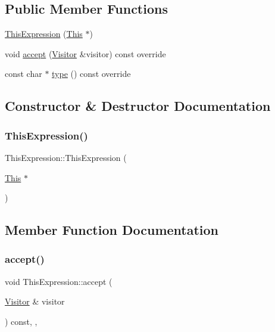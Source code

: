 \subsection*{Public Member Functions}
\begin{DoxyCompactItemize}
\item 
\hyperlink{struct_this_expression_ab81dc385702b0bad05253b765b96fa32}{This\+Expression} (\hyperlink{struct_this}{This} $\ast$)
\item 
void \hyperlink{struct_this_expression_ac22d0e35a45a0578fc864005c0a66def}{accept} (\hyperlink{struct_visitor}{Visitor} \&visitor) const override
\item 
const char $\ast$ \hyperlink{struct_this_expression_a957c14e181fce402594ddf55a0ad4309}{type} () const override
\end{DoxyCompactItemize}


\subsection{Constructor \& Destructor Documentation}
\mbox{\label{struct_this_expression_ab81dc385702b0bad05253b765b96fa32}} 
\subsubsection{\texorpdfstring{This\+Expression()}{ThisExpression()}}
{\footnotesize\ttfamily This\+Expression\+::\+This\+Expression (\begin{DoxyParamCaption}\item[{\hyperlink{struct_this}{This} $\ast$}]{ }\end{DoxyParamCaption})\hspace{0.3cm}{\ttfamily [inline]}}



\subsection{Member Function Documentation}
\mbox{\label{struct_this_expression_ac22d0e35a45a0578fc864005c0a66def}} 
\subsubsection{\texorpdfstring{accept()}{accept()}}
{\footnotesize\ttfamily void This\+Expression\+::accept (\begin{DoxyParamCaption}\item[{\hyperlink{struct_visitor}{Visitor} \&}]{visitor }\end{DoxyParamCaption}) const\hspace{0.3cm}{\ttfamily [inline]}, {\ttfamily [override]}, {\ttfamily [virtual]}}



